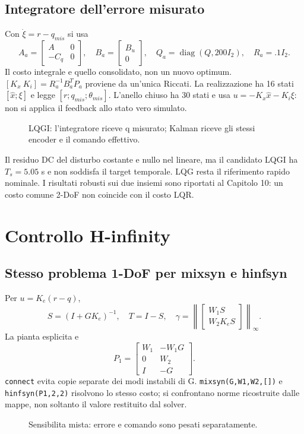 \documentclass[11pt,a4paper,oneside]{report}
\newcommand{\schema}[2]{\begin{figure}[htbp]\centering\resizebox{.95\linewidth}{!}{}\caption{#2}\end{figure}}
\begin{document}
\section{Integratore dell'errore misurato}
Con $\dot\xi=r-q_{mis}$ si usa
\[
A_a=\begin{bmatrix}A&0\\-C_q&0\end{bmatrix},\quad
B_a=\begin{bmatrix}B_u\\0\end{bmatrix},\quad
Q_a=\operatorname{diag}(Q,200I_2),\quad R_a=.1I_2.
\]
Il costo integrale e quello consolidato, non un nuovo optimum.
$[K_x\ K_i]=R_a^{-1}B_a^TP_a$ proviene da un'unica Riccati.
La realizzazione ha 16 stati $[\hat x;\xi]$ e legge
$[r;q_{mis};\theta_{mis}]$. L'anello chiuso ha 30 stati e usa
$u=-K_x\hat x-K_i\xi$: non si applica il feedback allo stato vero simulato.
\schema{lqgi}{LQGI: l'integratore riceve q misurato; Kalman riceve gli stessi encoder e il comando effettivo.}
Il residuo DC del disturbo costante e nullo nel lineare, ma il candidato
LQGI ha $T_s=5.05$ s e non soddisfa il target temporale. LQG resta il
riferimento rapido nominale. I risultati robusti sui due insiemi sono
riportati al Capitolo 10: un costo comune 2-DoF non coincide con il costo LQR.

\chapter{Controllo H-infinity}
\section{Stesso problema 1-DoF per mixsyn e hinfsyn}
Per $u=K_e(r-q)$,
\[
S=(I+GK_e)^{-1},\quad T=I-S,\quad
\gamma=\left\|\begin{bmatrix}W_1S\\W_2K_eS\end{bmatrix}\right\|_\infty.
\]
La pianta esplicita e
\[
P_1=\begin{bmatrix}W_1&-W_1G\\0&W_2\\I&-G\end{bmatrix}.
\]
\texttt{connect} evita copie separate dei modi instabili di G.
\texttt{mixsyn(G,W1,W2,[])} e \texttt{hinfsyn(P1,2,2)} risolvono
lo stesso costo; si confrontano norme ricostruite dalle mappe, non soltanto
il valore restituito dal solver.
\schema{mixsyn}{Sensibilita mista: errore e comando sono pesati separatamente.}
\end{document}
